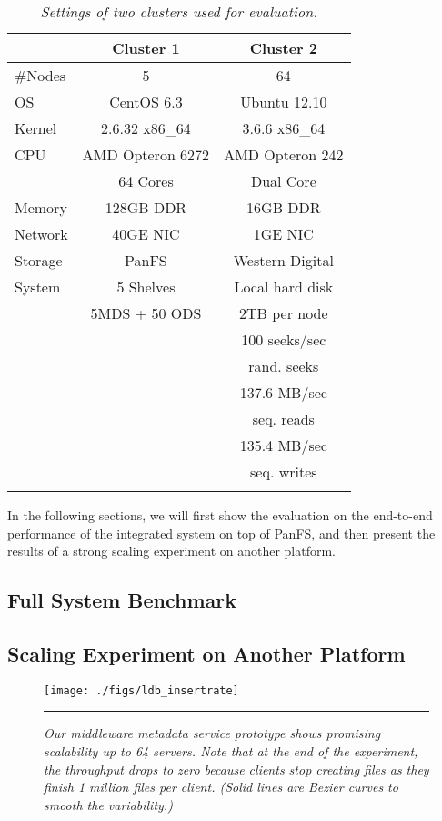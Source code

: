 \begin{footnotesize}
\begin{table}
\begin{tabular}{lcc}
\toprule
      & Cluster 1 & Cluster 2 \\
\midrule
\#Nodes & 5 & 64 \\
\hline
OS &   CentOS 6.3 &  Ubuntu 12.10 \\
Kernel & 2.6.32 x86\_64 & 3.6.6 x86\_64 \\
\hline
CPU & AMD Opteron 6272 &  AMD Opteron 242 \\
    & 64 Cores & Dual Core\\
\hline
Memory & 128GB DDR &  16GB DDR \\
\hline
Network & 40GE NIC &  1GE NIC  \\
\hline
Storage & PanFS & Western Digital \\
System &      5 Shelves & Local hard disk  \\
       &   5MDS + 50 ODS &  2TB per node  \\
& & 100 seeks/sec \\
& & rand. seeks   \\
& & 137.6 MB/sec  \\
& & seq. reads    \\
& & 135.4 MB/sec  \\
& & seq. writes   \\
\bottomrule \\
\end{tabular}
\caption{
\textit{\footnotesize Settings of two clusters used for evaluation.}
}
\label{tab:setting}
\end{table}
\end{footnotesize}

In the following sections, we will first show the evaluation
on the end-to-end performance of the integrated system on top of PanFS,
and then present the results of a strong scaling experiment on another platform.

\subsection{Full System Benchmark}
\label{sec:fullsystem}


\subsection{Scaling Experiment on Another Platform}

\begin{figure*}[t]
\centerline{\texttt{[image: ./figs/ldb\_insertrate]}}
\vspace{10pt}
\caption{\textit{\footnotesize 
Our middleware metadata service prototype shows promising scalability
up to 64 servers.
Note that at the end of the experiment,
the throughput drops to zero
because clients stop creating files as they finish 1 million files per client.
(Solid lines are Bezier curves to smooth the variability.)
}
}
\hrule
\label{graph:ldb-scaling}
\end{figure*}

